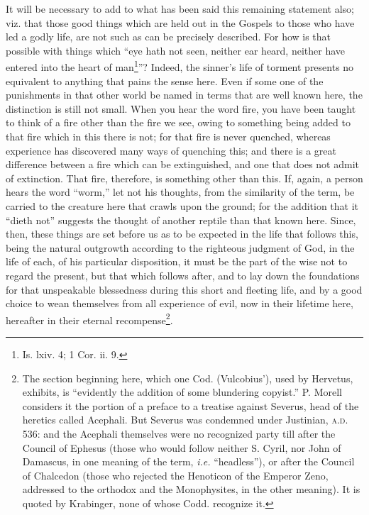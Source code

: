 It will be necessary to add to what has been said this remaining statement also; viz. that those good things which are held out in the Gospels to those who have led a godly life, are not such as can be precisely described. For how is that possible with things which “eye hath not seen, neither ear heard, neither have entered into the heart of man\footnote{Is. lxiv. 4; 1 Cor. ii. 9.}”? Indeed, the sinner’s life of torment presents no equivalent to anything that pains the sense here. Even if some one of the punishments in that other world be named in terms that are well known here, the distinction is still not small. When you hear the word fire, you have been taught to think of a fire other than the fire we see, owing to something being added to that fire which in this there is not; for that fire is never quenched, whereas experience has discovered many ways of quenching this; and there is a great difference between a fire which can be extinguished, and one that does not admit of extinction. That fire, therefore, is something other than this. If, again, a person hears the word “worm,” let not his thoughts, from the similarity of the term, be carried to the creature here that crawls upon the ground; for the addition that it “dieth not” suggests the thought of another reptile than that known here. Since, then, these things are set before us as to be expected in the life that follows this, being the natural outgrowth according to the righteous judgment of God, in the life of each, of his particular disposition, it must be the part of the wise not to regard the present, but that which follows after, and to lay down the foundations for that unspeakable blessedness during this short and fleeting life, and by a good choice to wean themselves from all experience of evil, now in their lifetime here, hereafter in their eternal recompense\footnote{The section beginning here, which one Cod. (Vulcobius’), used by Hervetus, exhibits, is “evidently the addition of some blundering copyist.” P. Morell considers it the portion of a preface to a treatise against Severus, head of the heretics called Acephali. But Severus was condemned under Justinian, \textsc{a.d.} 536: and the Acephali themselves were no recognized party till after the Council of Ephesus (those who would follow neither S. Cyril, nor John of Damascus, in one meaning of the term, \emph{i.e.} “headless”), or after the Council of Chalcedon (those who rejected the Henoticon of the Emperor Zeno, addressed to the orthodox and the Monophysites, in the other meaning). It is quoted by Krabinger, none of whose Codd. recognize it.}.

